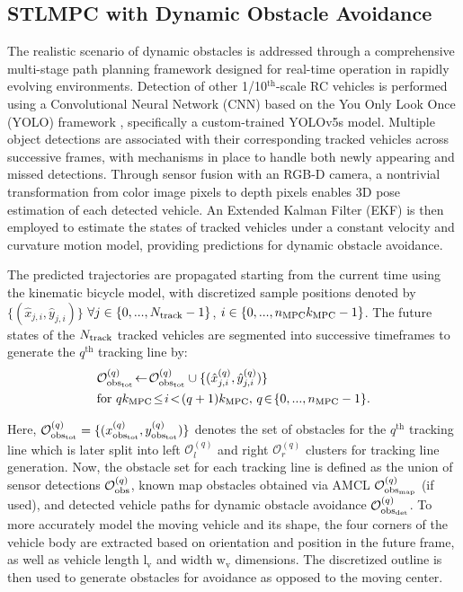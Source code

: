 \documentclass[journal]{IEEEtran}
\begin{document}
\subsection{STLMPC with Dynamic Obstacle Avoidance}\label{sec4}
The realistic scenario of dynamic obstacles is addressed through a comprehensive multi-stage path planning framework designed for real-time operation in rapidly evolving environments. Detection of other 1/10$^{\text{th}}$-scale RC vehicles is performed using a Convolutional Neural Network (CNN) based on the You Only Look Once (YOLO) framework \cite{Redmon2016}, specifically a custom-trained YOLOv5s model. Multiple object detections are associated with their corresponding tracked vehicles across successive frames, with mechanisms in place to handle both newly appearing and missed detections. Through sensor fusion with an RGB-D camera, a nontrivial transformation from color image pixels to depth pixels enables 3D pose estimation of each detected vehicle. An Extended Kalman Filter (EKF) is then employed to estimate the states of tracked vehicles under a constant velocity and curvature motion model, providing predictions for dynamic obstacle avoidance.

The predicted trajectories are propagated starting from the current time using the kinematic bicycle model, with discretized sample positions denoted by $\{(\hat x_{j,i},\hat y_{j,i})\}$ \mbox{$\forall j\in\{0,...,N_\textup{track}-1\}$}, \mbox{$i\in\{0,...,n_\textup{MPC}k_\textup{MPC}-1\}$}. The future states of the $N_\textup{track}$ tracked vehicles are segmented into successive timeframes to generate the $q^{\text{th}}$ tracking line by:
\begin{align}
    &\mathcal{O}^{(q)}_{\textup{obs}_\textup{tot}} \!\leftarrow\! \mathcal{O}^{(q)}_{\textup{obs}_\textup{tot}} \cup \{(\hat x^{(q)}_{j,i},\hat y^{(q)}_{j,i})\}\nonumber \\ &\text{for}\,\, qk_\textup{MPC}\!\leq\! i\!<\!(q+1)k_\textup{MPC}, \,q \!\in\!\{0,...,n_\textup{MPC}-1\}.
    \label{4.4.2}
\end{align}

Here, $\mathcal{O}^{(q)}_{\textup{obs}_\textup{tot}}=\{(x^{(q)}_{\textup{obs}_\textup{tot}},y^{(q)}_{\textup{obs}_\textup{tot}})\}$ denotes the set of obstacles for the $q^{\text{th}}$ tracking line which is later split into left $\mathcal{O}^{(q)}_{l}$ and right $\mathcal{O}^{(q)}_{r}$ clusters for tracking line generation. Now, the obstacle set for each tracking line is defined as the union of sensor detections \mbox{$\mathcal{O}^{(q)}_\textup{obs}$}, known map obstacles obtained via AMCL \mbox{$\mathcal{O}^{(q)}_{\textup{obs}_\textup{map}}$} (if used), and detected vehicle paths for dynamic obstacle avoidance \mbox{$\mathcal{O}^{(q)}_{\textup{obs}_\textup{det}}$}. To more accurately model the moving vehicle and its shape, the four corners of the vehicle body are extracted based on orientation and position in the future frame, as well as vehicle length $\text{l}_\text{v}$ and width $\text{w}_\text{v}$ dimensions. The discretized outline is then used to generate obstacles for avoidance as opposed to the moving center.
\end{document}
